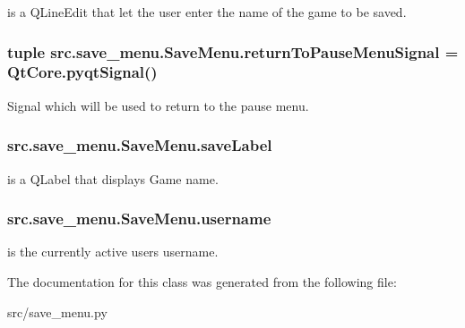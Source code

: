 is a Q\+Line\+Edit that let the user enter the name of the game to be saved. 

\hypertarget{classsrc_1_1save__menu_1_1_save_menu_a91e3384b3ca4264682fd7cc2fce47b0f}{}
\subsubsection[{return\+To\+Pause\+Menu\+Signal}]{\setlength{\rightskip}{0pt plus 5cm}tuple src.\+save\+\_\+menu.\+Save\+Menu.\+return\+To\+Pause\+Menu\+Signal = Qt\+Core.\+pyqt\+Signal()\hspace{0.3cm}{\ttfamily [static]}}\label{classsrc_1_1save__menu_1_1_save_menu_a91e3384b3ca4264682fd7cc2fce47b0f}


Signal which will be used to return to the pause menu. 

\hypertarget{classsrc_1_1save__menu_1_1_save_menu_aed6ba9a74fc14066593c5ce7b2ae4691}{}
\subsubsection[{save\+Label}]{\setlength{\rightskip}{0pt plus 5cm}src.\+save\+\_\+menu.\+Save\+Menu.\+save\+Label}\label{classsrc_1_1save__menu_1_1_save_menu_aed6ba9a74fc14066593c5ce7b2ae4691}


is a Q\+Label that displays \textquotesingle{}Game name\textquotesingle{}. 

\hypertarget{classsrc_1_1save__menu_1_1_save_menu_afa694276e009bcb004df7c7a1a5da217}{}
\subsubsection[{username}]{\setlength{\rightskip}{0pt plus 5cm}src.\+save\+\_\+menu.\+Save\+Menu.\+username}\label{classsrc_1_1save__menu_1_1_save_menu_afa694276e009bcb004df7c7a1a5da217}


is the currently active user\textquotesingle{}s username. 



The documentation for this class was generated from the following file\+:\begin{DoxyCompactItemize}
\item 
src/save\+\_\+menu.\+py\end{DoxyCompactItemize}
